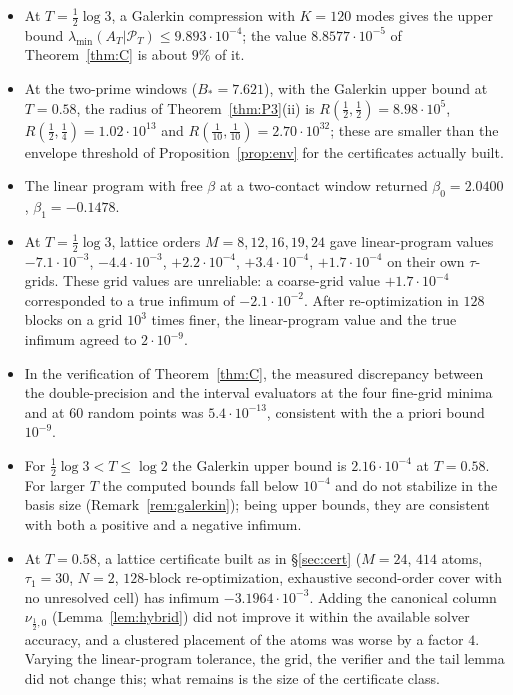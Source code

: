 \documentclass[11pt]{amsart}
\theoremstyle{definition}
\theoremstyle{remark}
\newcommand{\PT}{\mathcal P_T}
\newcommand{\lamA}{\lambda_{\min}(A_T|\PT)}
\begin{document}
\begin{itemize}
\item At $T=\frac12\log3$, a Galerkin compression with $K=120$ modes gives the upper bound
$\lamA\le9.893\cdot10^{-4}$; the value $8.8577\cdot10^{-5}$ of Theorem~\ref{thm:C} is about $9\%$ of it.
\item At the two-prime windows ($B_*=7.621$), with the Galerkin upper bound at $T=0.58$, the radius of
Theorem~\ref{thm:P3}(ii) is $R(\tfrac12,\tfrac12)=8.98\cdot10^5$, $R(\tfrac12,\tfrac14)=1.02\cdot10^{13}$
and $R(\tfrac1{10},\tfrac1{10})=2.70\cdot10^{32}$; these are smaller than the envelope threshold of
Proposition~\ref{prop:env} for the certificates actually built.
\item The linear program with free $\beta$ at a two-contact window returned $\beta_0=2.0400$,
$\beta_1=-0.1478$.
\item At $T=\frac12\log3$, lattice orders $M=8,12,16,19,24$ gave linear-program values
$-7.1\cdot10^{-3}$, $-4.4\cdot10^{-3}$, $+2.2\cdot10^{-4}$, $+3.4\cdot10^{-4}$, $+1.7\cdot10^{-4}$ on
their own $\tau$-grids. These grid values are unreliable: a coarse-grid value $+1.7\cdot10^{-4}$
corresponded to a true infimum of $-2.1\cdot10^{-2}$. After re-optimization in $128$ blocks on a grid
$10^3$ times finer, the linear-program value and the true infimum agreed to $2\cdot10^{-9}$.
\item In the verification of Theorem~\ref{thm:C}, the measured discrepancy between the double-precision
and the interval evaluators at the four fine-grid minima and at $60$ random points was
$5.4\cdot10^{-13}$, consistent with the a priori bound $10^{-9}$.
\item For $\frac12\log3<T\le\log2$ the Galerkin upper bound is $2.16\cdot10^{-4}$ at $T=0.58$. For
larger $T$ the computed bounds fall below $10^{-4}$ and do not stabilize in the basis size
(Remark~\ref{rem:galerkin}); being upper bounds, they are consistent with both a positive and a
negative infimum.
\item At $T=0.58$, a lattice certificate built as in \S\ref{sec:cert} ($M=24$, $414$ atoms, $\tau_1=30$,
$N=2$, $128$-block re-optimization, exhaustive second-order cover with no unresolved cell) has
infimum $-3.1964\cdot10^{-3}$. Adding the canonical column $\nu_{\frac12,0}$ (Lemma~\ref{lem:hybrid})
did not improve it within the available solver accuracy, and a clustered placement of the atoms was
worse by a factor $4$. Varying the linear-program tolerance, the grid, the verifier and the tail lemma
did not change this; what remains is the size of the certificate class.

\end{itemize}
\end{document}
